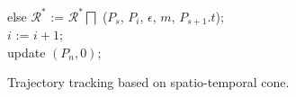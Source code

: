 \begin{figure}[tb!]
\begin{center}
{\begin{minipage}{3.3in}
{					\icc \>\hspace{3ex} else $\mathcal{R}^*$ := $\mathcal{R}^*\bigsqcap$ ($P_s$, $P_{i}$, $\epsilon$, $m$, $P_{s+1}.t$); \\
					\icc \>\hspace{3ex} $i$ := $i +1$;	\\
					\icc \>\hspace{0ex} update $(P_{n}, 0)$; 
				}
				\vspace{-2ex}
				\myhrule
			\end{minipage}
		}
	\end{center}
	\vspace{-2ex}
	\caption{\small Trajectory tracking based on spatio-temporal cone.}
	\label{alg:citt-s-full}
	\vspace{-2ex}
\end{figure}


